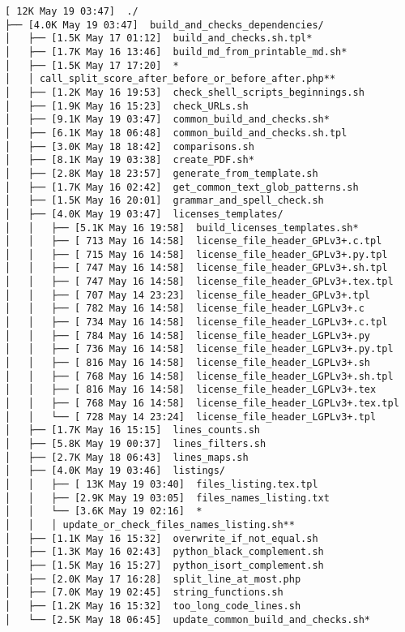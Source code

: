 \documentclass{article}
\begin{document}
\begin{verbatim}
[ 12K May 19 03:47]  ./
├── [4.0K May 19 03:47]  build_and_checks_dependencies/
│   ├── [1.5K May 17 01:12]  build_and_checks.sh.tpl*
│   ├── [1.7K May 16 13:46]  build_md_from_printable_md.sh*
│   ├── [1.5K May 17 17:20]  *
│   │ call_split_score_after_before_or_before_after.php**
│   ├── [1.2K May 16 19:53]  check_shell_scripts_beginnings.sh
│   ├── [1.9K May 16 15:23]  check_URLs.sh
│   ├── [9.1K May 19 03:47]  common_build_and_checks.sh*
│   ├── [6.1K May 18 06:48]  common_build_and_checks.sh.tpl
│   ├── [3.0K May 18 18:42]  comparisons.sh
│   ├── [8.1K May 19 03:38]  create_PDF.sh*
│   ├── [2.8K May 18 23:57]  generate_from_template.sh
│   ├── [1.7K May 16 02:42]  get_common_text_glob_patterns.sh
│   ├── [1.5K May 16 20:01]  grammar_and_spell_check.sh
│   ├── [4.0K May 19 03:47]  licenses_templates/
│   │   ├── [5.1K May 16 19:58]  build_licenses_templates.sh*
│   │   ├── [ 713 May 16 14:58]  license_file_header_GPLv3+.c.tpl
│   │   ├── [ 715 May 16 14:58]  license_file_header_GPLv3+.py.tpl
│   │   ├── [ 747 May 16 14:58]  license_file_header_GPLv3+.sh.tpl
│   │   ├── [ 747 May 16 14:58]  license_file_header_GPLv3+.tex.tpl
│   │   ├── [ 707 May 14 23:23]  license_file_header_GPLv3+.tpl
│   │   ├── [ 782 May 16 14:58]  license_file_header_LGPLv3+.c
│   │   ├── [ 734 May 16 14:58]  license_file_header_LGPLv3+.c.tpl
│   │   ├── [ 784 May 16 14:58]  license_file_header_LGPLv3+.py
│   │   ├── [ 736 May 16 14:58]  license_file_header_LGPLv3+.py.tpl
│   │   ├── [ 816 May 16 14:58]  license_file_header_LGPLv3+.sh
│   │   ├── [ 768 May 16 14:58]  license_file_header_LGPLv3+.sh.tpl
│   │   ├── [ 816 May 16 14:58]  license_file_header_LGPLv3+.tex
│   │   ├── [ 768 May 16 14:58]  license_file_header_LGPLv3+.tex.tpl
│   │   └── [ 728 May 14 23:24]  license_file_header_LGPLv3+.tpl
│   ├── [1.7K May 16 15:15]  lines_counts.sh
│   ├── [5.8K May 19 00:37]  lines_filters.sh
│   ├── [2.7K May 18 06:43]  lines_maps.sh
│   ├── [4.0K May 19 03:46]  listings/
│   │   ├── [ 13K May 19 03:40]  files_listing.tex.tpl
│   │   ├── [2.9K May 19 03:05]  files_names_listing.txt
│   │   └── [3.6K May 19 02:16]  *
│   │   │ update_or_check_files_names_listing.sh**
│   ├── [1.1K May 16 15:32]  overwrite_if_not_equal.sh
│   ├── [1.3K May 16 02:43]  python_black_complement.sh
│   ├── [1.5K May 16 15:27]  python_isort_complement.sh
│   ├── [2.0K May 17 16:28]  split_line_at_most.php
│   ├── [7.0K May 19 02:45]  string_functions.sh
│   ├── [1.2K May 16 15:32]  too_long_code_lines.sh
│   └── [2.5K May 18 06:45]  update_common_build_and_checks.sh*

\end{verbatim}
\end{document}
